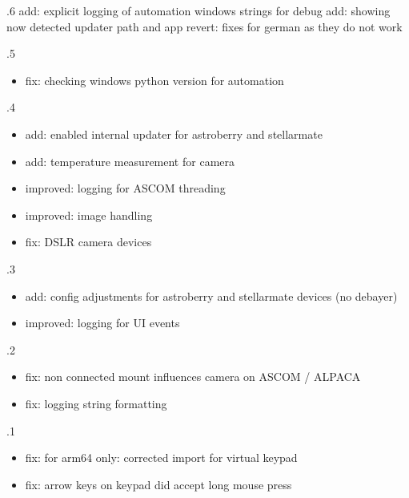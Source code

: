 \documentclass[a4paper,10pt,english]{sphinxmanual}
\begin{document}
.6
\sphinxhyphen{} add: explicit logging of automation windows strings for debug
\sphinxhyphen{} add: showing now detected updater path and app
\sphinxhyphen{} revert: fixes for german as they do not work

.5
\begin{itemize}
\item {} 
\sphinxAtStartPar
fix: checking windows python version for automation

\end{itemize}

.4
\begin{itemize}
\item {} 
\sphinxAtStartPar
add: enabled internal updater for astroberry and stellarmate

\item {} 
\sphinxAtStartPar
add: temperature measurement for camera

\item {} 
\sphinxAtStartPar
improved: logging for ASCOM threading

\item {} 
\sphinxAtStartPar
improved: image handling

\item {} 
\sphinxAtStartPar
fix: DSLR camera devices

\end{itemize}

.3
\begin{itemize}
\item {} 
\sphinxAtStartPar
add: config adjustments for astroberry and stellarmate devices (no debayer)

\item {} 
\sphinxAtStartPar
improved: logging for UI events

\end{itemize}

.2
\begin{itemize}
\item {} 
\sphinxAtStartPar
fix: non connected mount influences camera on ASCOM / ALPACA

\item {} 
\sphinxAtStartPar
fix: logging string formatting

\end{itemize}

.1
\begin{itemize}
\item {} 
\sphinxAtStartPar
fix: for arm64 only: corrected import for virtual keypad

\item {} 
\sphinxAtStartPar
fix: arrow keys on keypad did accept long mouse press

\end{itemize}
\end{document}
